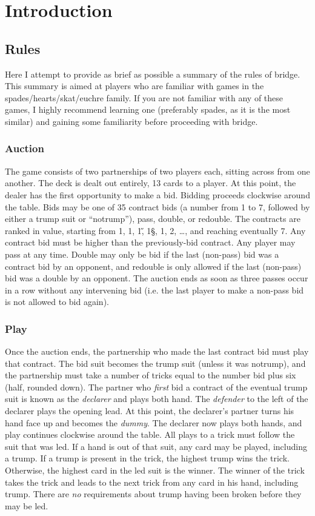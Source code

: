 \documentclass[oneside]{memoir}
\begin{document}
\addtocounter{chapter}{-1}

\chapter{Introduction}

\section{Rules}
Here I attempt to provide as brief as possible a summary of the rules of
bridge.  This summary is aimed at players who are familiar with games
in the spades/hearts/skat/euchre family.  If you are not familiar with any
of these games, I highly recommend learning one (preferably spades, as it
is the most similar) and gaining some familiarity before proceeding with
bridge.

\subsection{Auction}
The game consists of two partnerships of two players each, sitting
across from one another.  The deck is dealt out entirely, 13 cards to
a player.  At this point, the dealer has the first opportunity to make
a bid.  Bidding proceeds clockwise around the table.  Bids may be one
of 35 contract bids (a number from 1 to 7, followed by either a trump
suit or ``notrump''), pass, double, or redouble.  The contracts are
ranked in value, starting from 1\C, 1\D, 1\H, 1\S, 1\NT, 2\C, \ldots,
and reaching eventually 7\NT.  Any contract bid must be higher than
the previously-bid contract.  Any player may pass at any time.  Double
may only be bid if the last (non-pass) bid was a contract bid by an
opponent, and redouble is only allowed if the last (non-pass) bid was
a double by an opponent.  The auction ends as soon as three passes
occur in a row without any intervening bid (i.e. the last player to
make a non-pass bid is not allowed to bid again).

\subsection{Play}
Once the auction ends, the partnership who made the last contract bid
must play that contract.  The bid suit becomes the trump suit (unless
it was notrump), and the partnership must take a number of tricks
equal to the number bid plus six (half, rounded down).  The partner
who \textit{first} bid a contract of the eventual trump suit is known
as the \textit{declarer} and plays both hand.  The \textit{defender}
to the left of the declarer plays the opening lead.  At this point,
the declarer's partner turns his hand face up and becomes the
\textit{dummy}.  The declarer now plays both hands, and play continues
clockwise around the table.  All plays to a trick must follow the suit
that was led.  If a hand is out of that suit, any card may be played,
including a trump.  If a trump is present in the trick, the highest
trump wins the trick.  Otherwise, the highest card in the led suit is
the winner.  The winner of the trick takes the trick and leads to the
next trick from any card in his hand, including trump.  There are
\textit{no} requirements about trump having been broken before they
may be led.
\end{document}
